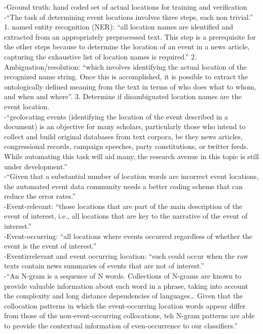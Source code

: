 -{\color{orange}Ground truth: hand coded set of actual locations for training and verification\cite{Lee2019}}\\
-{\color{orange}“The task of determining event locations involves three steps, each non trivial.” 1. named entity recognition (NER): “all location names are identified and extracted from an appropriately preprocessed text. This step is a prerequisite for the other steps because to determine the location of an event in a news article, capturing the exhaustive list of location names is required.” 2. Ambiguation/resolution: “which involves identifying the actual location of the recognized name string. Once this is accomplished, it is possible to extract the ontologically defined meaning from the text in terms of who does what to whom, and when and where”. 3. Determine if disambiguated location names are the event location.\cite{Lee2019}}\\
-{\color{orange}“geolocating events (identifying the location of the event described in a document) is an objective for many scholars, particularly those who intend to collect and build original databases from text corpora, be they news articles, congressional records, campaign speeches, party constitutions, or twitter feeds. While automating this task will aid many, the research avenue in this topic is still under development.”\cite{Lee2019}}\\
-{\color{orange}“Given that a substantial number of location words are incorrect event locations, the automated event data community needs a better coding scheme that can reduce the error rates.”\cite{Lee2019}}\\
-{\color{orange}Event-relevant: “those locations that are part of the main description of the event of interest, i.e., all locations that are key to the narrative of the event of interest.”\cite{Lee2019}}\\
-{\color{orange}Event-occurring: “all locations where events occurred regardless of whether the event is the event of interest.” \cite{Lee2019}}\\
-{\color{orange}Eventirrelevant and event occurring location: “such could occur when the raw texts contain news summaries of events that are not of interest.”\cite{Lee2019}}\\
-{\color{orange}“An N-gram is a sequence of N words. Collections of N-grams are known to provide valuable information about each word in a phrase, taking into account the complexity and long distance dependencies of languages… Given that the collocation patterns in which the event-occurring location words appear differ from those of the non-event-occurring collocations, teh N-gram patterns are able to provide the contextual information of even-occurrence to our classifiers.”\cite{Lee2019}}\\
